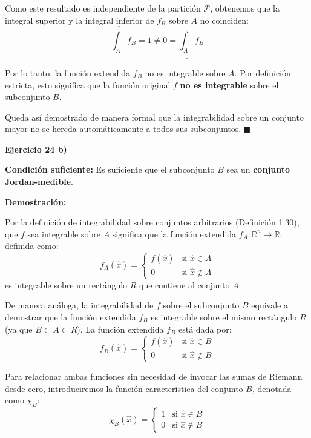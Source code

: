 \documentclass[11pt,letterpaper]{article}
\begin{document}
Como este resultado es independiente de la partición $\mathcal{P}$, obtenemos que la integral superior y la integral inferior de $f_B$ sobre $A$ no coinciden:
\begin{equation*}
\overline{\int_A} f_B = 1 \neq 0 = \underline{\int_A} f_B
\end{equation*}

Por lo tanto, la función extendida $f_B$ no es integrable sobre $A$. Por definición estricta, esto significa que la función original $f$ \textbf{no es integrable} sobre el subconjunto $B$. 

Queda así demostrado de manera formal que la integrabilidad sobre un conjunto mayor no se hereda automáticamente a todos sus subconjuntos. \hfill $\blacksquare$

\textbf{Ejercicio 24 b)}

\textbf{Condición suficiente:} 
Es suficiente que el subconjunto $B$ sea un \textbf{conjunto Jordan-medible}.

\textbf{Demostración:}

Por la definición de integrabilidad sobre conjuntos arbitrarios (Definición 1.30), que $f$ sea integrable sobre $A$ significa que la función extendida $f_A: \mathbb{R}^n \rightarrow \mathbb{R}$, definida como:
\begin{equation*}
f_A(\hat{x}) = 
\begin{cases} 
f(\hat{x}) & \text{si } \hat{x} \in A \\ 
0 & \text{si } \hat{x} \notin A 
\end{cases}
\end{equation*}
es integrable sobre un rectángulo $R$ que contiene al conjunto $A$.

De manera análoga, la integrabilidad de $f$ sobre el subconjunto $B$ equivale a demostrar que la función extendida $f_B$ es integrable sobre el mismo rectángulo $R$ (ya que $B \subset A \subset R$). La función extendida $f_B$ está dada por:
\begin{equation*}
f_B(\hat{x}) = 
\begin{cases} 
f(\hat{x}) & \text{si } \hat{x} \in B \\ 
0 & \text{si } \hat{x} \notin B 
\end{cases}
\end{equation*}

Para relacionar ambas funciones sin necesidad de invocar las sumas de Riemann desde cero, introduciremos la función característica del conjunto $B$, denotada como $\chi_B$:
\begin{equation*}
\chi_B(\hat{x}) = 
\begin{cases} 
1 & \text{si } \hat{x} \in B \\ 
0 & \text{si } \hat{x} \notin B 
\end{cases}
\end{equation*}
\end{document}
